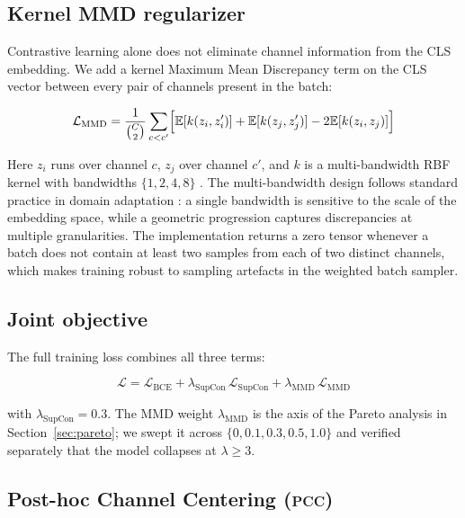\documentclass[preprint,12pt,authoryear]{elsarticle}
\newcommand{\pcc}{\textsc{pcc}}
\begin{document}
\subsection{Kernel MMD regularizer}

Contrastive learning alone does not eliminate channel information
from the CLS embedding. We add a kernel Maximum Mean Discrepancy
term on the CLS vector between every pair of channels present in the
batch:

\begin{equation}
\mathcal{L}_{\text{MMD}} =
\frac{1}{\binom{C}{2}} \sum_{c < c'} \Bigl[
\mathbb{E}[k(z_i, z_i')] + \mathbb{E}[k(z_j, z_j')]
- 2 \mathbb{E}[k(z_i, z_j)] \Bigr]
\label{eq:mmd}
\end{equation}

Here $z_i$ runs over channel $c$, $z_j$ over channel $c'$, and $k$
is a multi-bandwidth RBF kernel with bandwidths $\{1, 2, 4, 8\}$
\citep{gretton2012mmd}. The multi-bandwidth design follows standard
practice in domain adaptation \citep{long2015dan}: a single
bandwidth is sensitive to the scale of the embedding space, while a
geometric progression captures discrepancies at multiple
granularities. The implementation returns a zero tensor whenever a
batch does not contain at least two samples from each of two
distinct channels, which makes training robust to sampling artefacts
in the weighted batch sampler.

\subsection{Joint objective}

The full training loss combines all three terms:

\begin{equation}
\mathcal{L} = \mathcal{L}_{\text{BCE}}
+ \lambda_{\text{SupCon}} \, \mathcal{L}_{\text{SupCon}}
+ \lambda_{\text{MMD}} \, \mathcal{L}_{\text{MMD}}
\label{eq:joint}
\end{equation}

with $\lambda_{\text{SupCon}} = 0.3$. The MMD weight
$\lambda_{\text{MMD}}$ is the axis of the Pareto analysis in
Section~\ref{sec:pareto}; we swept it across
$\{0, 0.1, 0.3, 0.5, 1.0\}$ and verified separately that the model
collapses at $\lambda \geq 3$.

\subsection{Post-hoc Channel Centering (\pcc)}
\label{sec:pcc}
\end{document}
